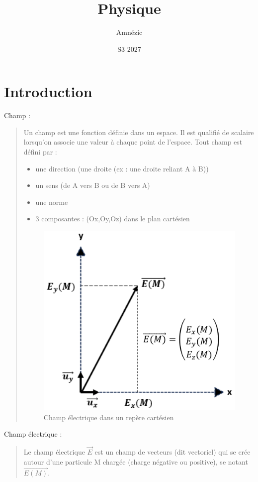 \documentclass{article}
\author{Amnézic}
\date{S3 2027}
\title{Physique}
\begin{document}
\maketitle
\newpage
\tableofcontents
\newpage
\section{Introduction}
Champ :
\begin{quote}
    Un champ est une fonction définie dans un espace. Il est qualifié de scalaire lorsqu'on associe une valeur à chaque point de l'espace. Tout champ est défini par :
    \begin{itemize}
        \item une direction (une droite (ex : une droite reliant A à B))
        \item un sens (de A vers B ou de B vers A)
        \item une norme
        \item 3 composantes : (Ox,Oy,Oz) dans le plan cartésien
    \end{itemize}
    \begin{figure}[ht]
        \centering
        \includegraphics[scale=0.3]{figure1.png}
        \caption{Champ électrique dans un repère cartésien}
    \end{figure}
\end{quote}

Champ électrique :
\begin{quote}
    Le champ électrique $\overrightarrow{E}$ est un champ de vecteurs (dit vectoriel) qui se crée autour d'une particule M chargée (charge négative ou positive), se notant $\overrightarrow{E(M)}$.\newline
\end{quote}
\end{document}
